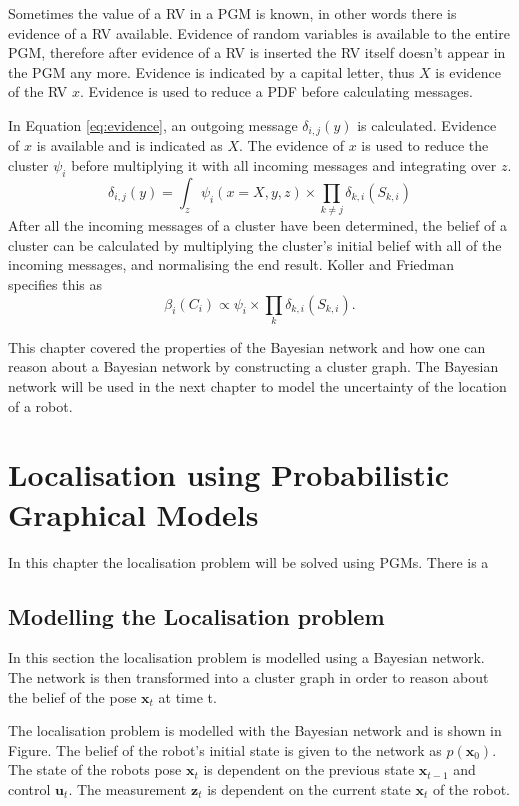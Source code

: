 \documentclass[12pt,oneside,openany,a4paper, %
afrikaans,english,
]{memoir}
\numberwithin{equation}{chapter}
\begin{document}
Sometimes the value of a RV in a PGM is known, in other words there is evidence of a RV available. Evidence of random variables is available to the entire PGM, therefore after evidence of a RV is inserted the RV itself doesn't appear in the PGM any more. Evidence is indicated by a capital letter, thus $X$ is evidence of the RV $x$. Evidence is used to reduce a PDF before calculating messages.

In Equation \ref{eq:evidence}, an outgoing message $\delta_{i , j}(y)$ is calculated. Evidence of $x$ is available and is indicated as $X$. The evidence of $x$ is used to reduce the cluster $\psi_i$ before multiplying it with all incoming messages and integrating over $z$.
\begin{equation}\label{eq:evidence}
\delta_{i , j}(y) = \int_{z}\psi_i(x = X, y, z) \times \prod_{k\ne j} \delta_{k , i}(S_{k,i})
\end{equation}
After all the incoming messages of a cluster have been determined, the belief of a cluster can be calculated by multiplying the cluster's initial belief with all of the incoming messages, and normalising the end result. Koller and Friedman~\cite{koller} specifies this as
\begin{equation}
\beta_i(C_i) \propto \psi_i \times \prod_{k} \delta_{k , i}(S_{k,i}).
\end{equation}

This chapter covered the properties of the Bayesian network and how one can reason about a Bayesian network by constructing a cluster graph. The Bayesian network will be used in the next chapter to model the uncertainty of the location of a robot.
\chapter{Localisation using Probabilistic Graphical Models}
In this chapter the localisation problem will be solved using PGMs. There is a 
\section{Modelling the Localisation problem}
In this section the localisation problem is modelled using a Bayesian network. The network is then transformed into a cluster graph in order to reason about the belief of the pose $\bm{x}_t$ at time t.

The localisation problem is modelled with the Bayesian network and is shown in Figure. The belief of the robot's initial state is given to the network as $p(\bm{x}_0)$. The state of the robots pose $\bm{x}_t$ is dependent on the previous state $\bm{x}_{t-1}$ and control $\bm{u}_t$. The measurement $\bm{z}_t$ is dependent on the current state $\bm{x}_t$ of the robot.
\end{document}
